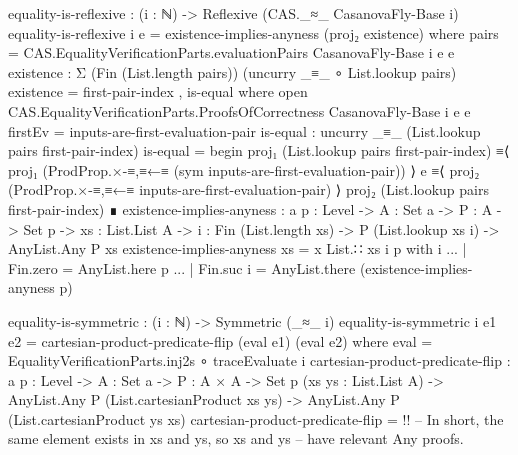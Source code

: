 \documentclass{report}
\begin{document}
\begin{code}
  equality-is-reflexive : (i : ℕ) -> Reflexive (CAS._≈_ CasanovaFly-Base i)
  equality-is-reflexive i {e} = existence-implies-anyness (proj₂ existence)
    where
    pairs = CAS.EqualityVerificationParts.evaluationPairs CasanovaFly-Base i e e
    existence : Σ (Fin (List.length pairs)) (uncurry _≡_ ∘ List.lookup pairs)
    existence = first-pair-index , is-equal
      where
      open CAS.EqualityVerificationParts.ProofsOfCorrectness CasanovaFly-Base i e e
      firstEv = inputs-are-first-evaluation-pair
      is-equal : uncurry _≡_ (List.lookup pairs first-pair-index)
      is-equal = begin
        proj₁ (List.lookup pairs first-pair-index)
          ≡⟨ proj₁ (ProdProp.×-≡,≡←≡ (sym inputs-are-first-evaluation-pair)) ⟩
        e
          ≡⟨ proj₂ (ProdProp.×-≡,≡←≡ inputs-are-first-evaluation-pair) ⟩
        proj₂ (List.lookup pairs first-pair-index) ∎
    existence-implies-anyness :
      {a p : Level} ->
      {A : Set a} ->
      {P : A -> Set p} ->
      {xs : List.List A} ->
      {i : Fin (List.length xs)} ->
      P (List.lookup xs i) ->
      AnyList.Any P xs
    existence-implies-anyness {xs = x List.∷ xs} {i} p with i
    ... | Fin.zero = AnyList.here p
    ... | Fin.suc i = AnyList.there (existence-implies-anyness p)

  equality-is-symmetric : (i : ℕ) -> Symmetric (_≈_ i)
  equality-is-symmetric i {e1} {e2} = cartesian-product-predicate-flip (eval e1) (eval e2)
    where
    eval = EqualityVerificationParts.inj2s ∘ traceEvaluate i
    cartesian-product-predicate-flip :
      {a p : Level} ->
      {A : Set a} ->
      {P : A × A -> Set p}
      (xs ys : List.List A) ->
      AnyList.Any P (List.cartesianProduct xs ys) ->
      AnyList.Any P (List.cartesianProduct ys xs)
    cartesian-product-predicate-flip = {!!}
    -- In short, the same element exists in xs and ys, so xs and ys
    -- have relevant Any proofs.
\end{code}
\end{document}
